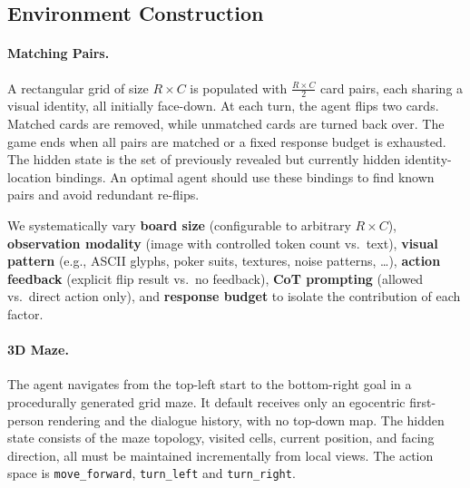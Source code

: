 \subsection{Environment Construction}
\label{sec:environment_construction}

\paragraph{Matching Pairs.}
A rectangular grid of size $R{\times}C$ is populated with $\frac{R \times C}{2}$ card pairs, each sharing a visual identity, all initially face-down. At each turn, the agent flips two cards. Matched cards are removed, while unmatched cards are turned back over. The game ends when all pairs are matched or a fixed response budget is exhausted. The hidden state is the set of previously revealed but currently hidden identity-location bindings. An optimal agent should use these bindings to find known pairs and avoid redundant re-flips.

We systematically vary \textbf{board size} (configurable to arbitrary $R{\times}C$), \textbf{observation modality} (image with controlled token count vs.\ text), \textbf{visual pattern} (e.g., ASCII glyphs, poker suits, textures, noise patterns, \ldots), \textbf{action feedback} (explicit flip result vs.\ no feedback), \textbf{CoT prompting} (allowed vs.\ direct action only), and \textbf{response budget} to isolate the contribution of each factor.



\paragraph{3D Maze.}
The agent navigates from the top-left start to the bottom-right goal in a procedurally generated grid maze. It default receives only an egocentric first-person rendering and the dialogue history, with no top-down map. The hidden state consists of the maze topology, visited cells, current position, and facing direction, all must be maintained incrementally from local views. The action space is \texttt{move\_forward}, \texttt{turn\_left} and \texttt{turn\_right}. 

